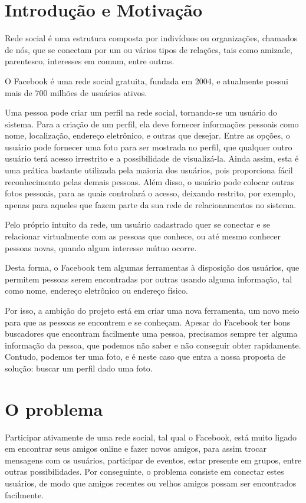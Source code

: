 \documentclass[10pt,a4paper]{article}
\begin{document}
\tableofcontents
\newpage 
\doublespacing

\section{Introdução e Motivação}
Rede social é uma estrutura composta por indivíduos ou organizações, chamados de nós, que se conectam por um ou vários tipos de relações, tais como amizade, parentesco, interesses em comum, entre outras.

O Facebook é uma rede social gratuita, fundada em 2004, e atualmente possui mais de 700 milhões de usuários ativos.

Uma pessoa pode criar um perfil na rede social, tornando-se um usuário do sistema. Para a criação de um perfil, ela deve fornecer informações pessoais como nome, localização, endereço eletrônico, e outras que desejar. Entre as opções, o usuário pode fornecer uma foto para ser mostrada no perfil, que qualquer outro usuário terá acesso irrestrito e a possibilidade de visualizá-la. Ainda assim, esta é uma prática bastante utilizada pela maioria dos usuários, pois proporciona fácil reconhecimento pelas demais pessoas. Além disso, o usuário pode colocar outras fotos pessoais, para as quais controlará o acesso, deixando restrito, por exemplo, apenas para aqueles que fazem parte da sua rede de relacionamentos no sistema.

Pelo próprio intuito da rede, um usuário cadastrado quer se conectar e se relacionar virtualmente com as pessoas que conhece, ou até mesmo conhecer pessoas novas, quando algum interesse mútuo ocorre.

Desta forma, o Facebook tem algumas ferramentas à disposição dos usuários, que permitem pessoas serem encontradas por outras usando alguma informação, tal como nome, endereço eletrônico ou endereço físico.

Por isso, a ambição do projeto está em criar uma nova ferramenta, um novo meio para que as pessoas se encontrem e se conheçam. Apesar do Facebook ter bons buscadores que encontram facilmente uma pessoa, precisamos sempre ter alguma informação da pessoa, que podemos não saber e não conseguir obter rapidamente. Contudo, podemos ter uma foto, e é neste caso que entra a nossa proposta de solução: buscar um perfil dado uma foto.
\newpage
\section{O problema}
Participar ativamente de uma rede social, tal qual o Facebook, está muito ligado em encontrar seus amigos online e fazer novos amigos, para assim trocar mensagens com os usuários, participar de eventos, estar presente em grupos, entre outras possibilidades. Por conseguinte, o problema consiste em conectar estes usuários, de modo que amigos recentes ou velhos amigos possam ser encontrados facilmente.
\end{document}
